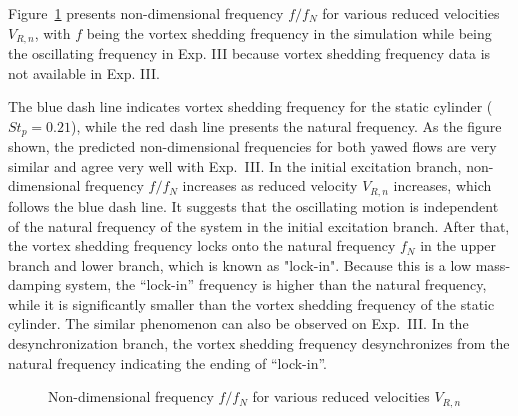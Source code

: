 Figure~\ref{fig:f_VIV} presents non-dimensional frequency $f/f_N$ for various
reduced velocities $V_{R,n}$, with $f$ being the vortex shedding frequency in
the simulation while being the oscillating frequency in Exp. III because vortex
shedding frequency data is not available in Exp. III. 


The blue dash line
indicates vortex shedding frequency for the static cylinder ($St_p=0.21$),
while the red dash line presents the natural frequency.  As the figure shown,
the predicted non-dimensional frequencies for both yawed flows are very similar
and agree very well with Exp.~III.  In the initial excitation branch,
non-dimensional frequency $f/f_N$ increases as reduced velocity $V_{R,n}$
increases, which follows the blue dash line. It suggests that the oscillating
motion is independent of the natural frequency of the system in the initial
excitation branch. After that, the vortex shedding frequency locks onto the
natural frequency $f_N$ in the upper branch and lower branch, which is known as
"lock-in". Because this is a low mass-damping system, the ``lock-in'' frequency
is higher than the natural frequency, while it is significantly smaller than
the vortex shedding frequency of the static cylinder. The similar phenomenon
can also be observed on Exp.~III.  In the desynchronization branch, the vortex
shedding frequency desynchronizes from the natural frequency indicating the
ending of ``lock-in''.
%
\begin{figure}[htb!]
  \caption{Non-dimensional frequency $f/f_N$ for various reduced velocities
    $V_{R,n}$}
  \label{fig:f_VIV}
\end{figure}

